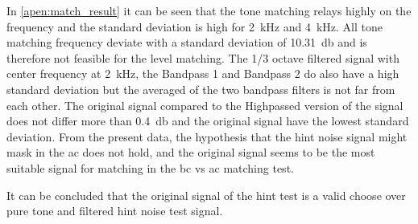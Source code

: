In \autoref{apen:match_result} it can be seen that the tone matching relays highly on the frequency and the standard deviation is high for \SI{2}{\kilo\hertz}  and \SI{4}{\kilo\hertz}. All tone matching frequency deviate with a standard deviation of \SI{10.31}{\decibel} and is therefore not feasible for the level matching. The 1/3 octave filtered signal with center frequency at \SI{2}{\kilo\hertz}, the Bandpass 1 and Bandpass 2 do also have a high standard deviation but the averaged of the two bandpass filters is not far from each other. The original signal compared to the Highpassed version of the signal does not differ more than \SI{0.4}{\decibel} and the original signal have the lowest standard deviation. From the present data, the hypothesis that the \gls{hint} noise signal might mask in the \gls{ac} does not hold, and the original signal seems to be the most suitable signal for matching in the \gls{bc} vs \gls{ac} matching test.

It can be concluded that the original signal of the \gls{hint} test is a valid choose over pure tone and filtered \gls{hint} noise test signal.


